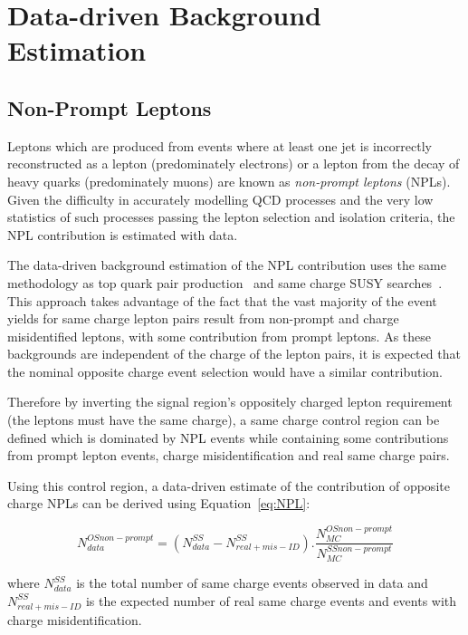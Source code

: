 \section{Data-driven Background Estimation}\label{sec:dataDrivenBackground}

\subsection{Non-Prompt Leptons}\label{sec:NPLs}
Leptons which are produced from events where at least one jet is incorrectly reconstructed as a lepton (predominately electrons) or a lepton from the decay of heavy quarks (predominately muons) are known as \emph{non-prompt leptons} (NPLs).
Given the difficulty in accurately modelling QCD processes and the very low statistics of such processes passing the lepton selection and isolation criteria, the NPL contribution is estimated with data.

The data-driven background estimation of the NPL contribution uses the same methodology as top quark pair production~\cite{CMS:2016syx} and same charge SUSY searches~\cite{CMS:2015vqc}.
This approach takes advantage of the fact that the vast majority of the event yields for same charge lepton pairs result from non-prompt and charge misidentified leptons, with some contribution from prompt leptons.
As these backgrounds are independent of the charge of the lepton pairs, it is expected that the nominal opposite charge event selection would have a similar contribution.

Therefore by inverting the signal region's oppositely charged lepton requirement (\ie the leptons must have the same charge), a same charge control region can be defined which is dominated by NPL events while containing some contributions from prompt lepton events, charge misidentification and real same charge pairs.

Using this control region, a data-driven estimate of the contribution of opposite charge NPLs can be derived using Equation~\ref{eq:NPL}:

\begin{equation}\label{eq:NPL}
 N_{data}^{OS non-prompt} = (N_{data}^{SS} - N^{SS}_{real + mis-ID}).\frac{N_{MC}^{OS non-prompt}}{N_{MC}^{SS non-prompt}}
\end{equation}

where $N_{data}^{SS}$ is the total number of same charge events observed in data and $N^{SS}_{real + mis-ID}$ is the expected number of real same charge events and events with charge misidentification.

